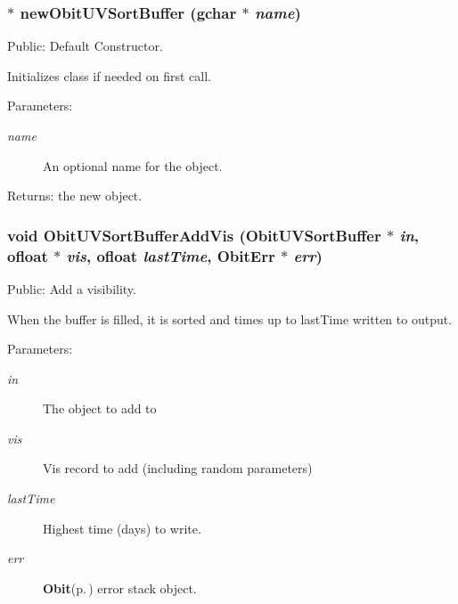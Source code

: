 \subsubsection{$\ast$ new\-Obit\-UVSort\-Buffer (gchar $\ast$ {\em name})}\label{ObitUVSortBuffer_8c_a7}


Public: Default Constructor. 

Initializes class if needed on first call. \begin{Desc}
\item[Parameters:]
\begin{description}
\item[{\em name}]An optional name for the object. \end{description}
\end{Desc}
\begin{Desc}
\item[Returns:]the new object. \end{Desc}
\subsubsection{\setlength{\rightskip}{0pt plus 5cm}void Obit\-UVSort\-Buffer\-Add\-Vis ({\bf Obit\-UVSort\-Buffer} $\ast$ {\em in}, {\bf ofloat} $\ast$ {\em vis}, {\bf ofloat} {\em last\-Time}, {\bf Obit\-Err} $\ast$ {\em err})}\label{ObitUVSortBuffer_8c_a12}


Public: Add a visibility. 

When the buffer is filled, it is sorted and times up to last\-Time written to output. \begin{Desc}
\item[Parameters:]
\begin{description}
\item[{\em in}]The object to add to \item[{\em vis}]Vis record to add (including random parameters) \item[{\em last\-Time}]Highest time (days) to write. \item[{\em err}]{\bf Obit}{\rm (p.\,\pageref{structObit})} error stack object. \end{description}
\end{Desc}
